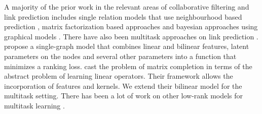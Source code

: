 \documentclass{bioinfo}
\begin{document}
A majority of the prior work in the relevant areas of collaborative filtering and link prediction includes single relation models that use neighbourhood based prediction \citep{sarwar01}, matrix factorization based approaches \citep{koren09,menon_ecml11} and bayesian approaches using graphical models \citep{jin02,phung09}. 
There have also been multitask approaches on link prediction \citep{zhang12,cao_icml2010,li09,cmf}. 
\cite{menon_ecml11} propose a single-graph model that combines linear 
and bilinear features, latent parameters on the nodes and several other parameters into a function that minimizes a ranking loss. 
\cite{abernethy} cast the problem of matrix completion in terms of the abstract problem of learning linear operators. Their framework allows the incorporation of features and kernels. We extend their bilinear model for the multitask setting. There has been a lot of work on other low-rank models for multitask learning \citep{ando2005,ji2009,chen2012,chen2013}. %

\end{document}
